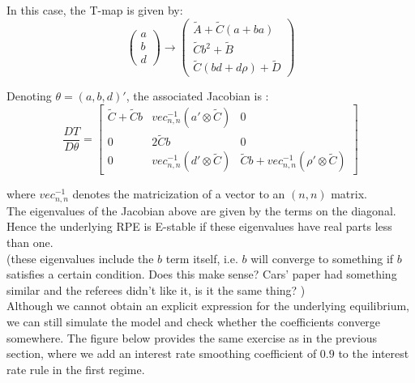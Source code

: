 \documentclass[12pt,reqno]{article}
\numberwithin{equation}{section}
\begin{document}
In this case, the T-map is given by: \\

$$
\begin{pmatrix} a \\ b \\ d \end{pmatrix} \rightarrow \begin{pmatrix} \tilde{A} + \tilde{C} (a+ba) \\ \tilde{C} b^2 + \tilde{B} \\  \tilde{C} (bd+d \rho) + \tilde{D} \end{pmatrix}
$$

Denoting $\theta = (a,b,d)' $, the associated Jacobian is : \\

$$ \frac{ D T } { D\theta }  = \begin{bmatrix} \tilde{C} + \tilde{C} b & vec_{n,n}^{-1} (a' \otimes \tilde{C}) & 0 \\
0 & 2 \tilde{C} b & 0 \\
0 & vec_{n,n}^{-1}(d' \otimes \tilde{C} ) & \tilde{C} b + vec_{n,n}^{-1} (\rho' \otimes \tilde{C} ) \end{bmatrix} $$

where $ vec_{n,n}^{-1} $ denotes the matricization of a vector to an $(n,n) $ matrix. \\

The eigenvalues of the Jacobian above are given by the terms on the diagonal. Hence the underlying RPE is E-stable if these eigenvalues have real parts less than one. \\

(these eigenvalues include the $ b $ term itself, i.e. $b $ will converge to something if $b $ satisfies a certain condition. Does this make sense? Cars' paper had something similar and the referees didn't like it, is it the same thing? ) \\

Although we cannot obtain an explicit expression for the underlying equilibrium, we can still simulate the model and check whether the coefficients converge somewhere. The figure below provides the same exercise as in the previous section, where we add an interest rate smoothing coefficient of $0.9$ to the interest rate rule in the first regime.
\end{document}
